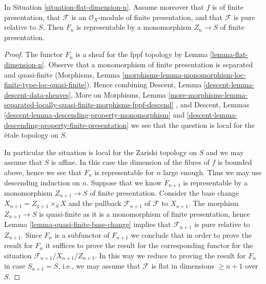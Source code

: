 %
\begin{theorem}
\label{theorem-flat-dimension-n-representable}
In Situation \ref{situation-flat-dimension-n}.
Assume moreover that $f$ is of finite presentation, that
$\mathcal{F}$ is an $\mathcal{O}_X$-module of finite presentation,
and that $\mathcal{F}$ is pure relative to $S$.
Then $F_n$ is representable by a monomorphism
$Z_n \to S$ of finite presentation.
\end{theorem}

\begin{proof}
The functor $F_n$ is a sheaf for the fppf topology by
Lemma \ref{lemma-flat-dimension-n}.
Observe that a monomorphism of finite presentation is
separated and quasi-finite (Morphisms, Lemma
\ref{morphisms-lemma-monomorphism-loc-finite-type-loc-quasi-finite}).
Hence combining
Descent, Lemma \ref{descent-lemma-descent-data-sheaves},
More on Morphisms, Lemma
\ref{more-morphisms-lemma-separated-locally-quasi-finite-morphisms-fppf-descend}
, and
Descent, Lemmas \ref{descent-lemma-descending-property-monomorphism} and
\ref{descent-lemma-descending-property-finite-presentation}
we see that the question is local for the \'etale topology on $S$.

\medskip\noindent
In particular the situation is local for the Zariski topology on $S$
and we may assume that $S$ is affine. In this case the dimension of the
fibres of $f$ is bounded above, hence we see that $F_n$ is representable
for $n$ large enough. Thus we may use descending induction on $n$.
Suppose that we know $F_{n + 1}$ is representable by a monomorphism
$Z_{n + 1} \to S$ of finite presentation. Consider the base change
$X_{n + 1} = Z_{n + 1} \times_S X$ and the pullback $\mathcal{F}_{n + 1}$
of $\mathcal{F}$ to $X_{n + 1}$. The morphism $Z_{n + 1} \to S$ is
quasi-finite as it is a monomorphism of finite presentation, hence
Lemma \ref{lemma-quasi-finite-base-change}
implies that $\mathcal{F}_{n + 1}$ is pure relative to $Z_{n + 1}$.
Since $F_n$ is a subfunctor of $F_{n + 1}$ we conclude that in order
to prove the result for $F_n$ it suffices to prove the result for the
corresponding functor for the situation
$\mathcal{F}_{n + 1}/X_{n + 1}/Z_{n + 1}$.
In this way we reduce to proving the result for $F_n$ in case
$S_{n + 1} = S$, i.e., we may assume that $\mathcal{F}$ is flat
in dimensions $\geq n + 1$ over $S$.


\end{proof}
